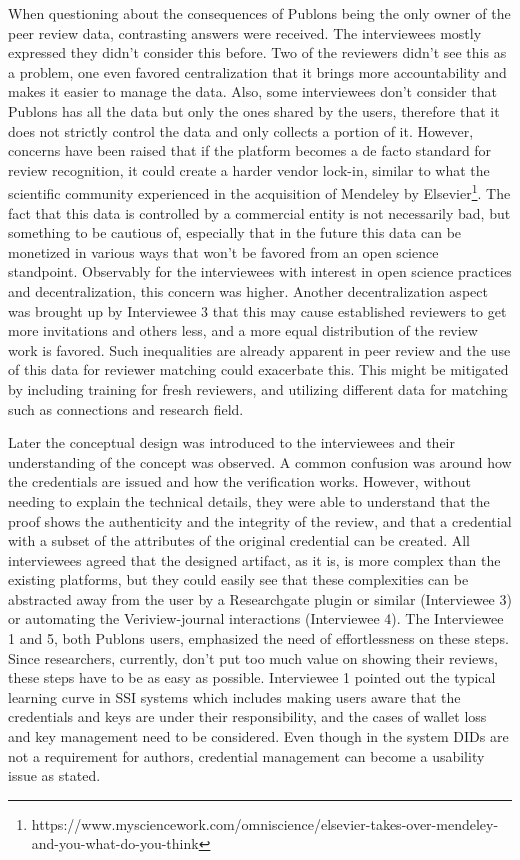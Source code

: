 When questioning about the consequences of Publons being the only owner of the peer review data, contrasting answers were received. The interviewees mostly expressed they didn't consider this before. Two of the reviewers didn't see this as a problem, one even favored centralization that it brings more accountability and makes it easier to manage the data. Also, some interviewees don't consider that Publons has all the data but only the ones shared by the users, therefore that it does not strictly control the data and only collects a portion of it. However, concerns have been raised that if the platform becomes a de facto standard for review recognition, it could create a harder vendor lock-in, similar to what the scientific community experienced in the acquisition of Mendeley by Elsevier\footnote{https://www.mysciencework.com/omniscience/elsevier-takes-over-mendeley-and-you-what-do-you-think}. The fact that this data is controlled by a commercial entity is not necessarily bad, but something to be cautious of, especially that in the future this data can be monetized in various ways that won't be favored from an open science standpoint. Observably for the interviewees with interest in open science practices and decentralization, this concern was higher. Another decentralization aspect was brought up by Interviewee 3 that this may cause established reviewers to get more invitations and others less, and a more equal distribution of the review work is favored. Such inequalities are already apparent in peer review \parencite{Warne.2016, Publons.2018,Ware.2008, Hochberg.2009} and the use of this data for reviewer matching could exacerbate this. This might be mitigated by including training for fresh reviewers, and utilizing different data for matching such as connections and research field. 

Later the conceptual design was introduced to the interviewees and their understanding of the concept was observed. A common confusion was around how the credentials are issued and how the verification works. However, without needing to explain the technical details, they were able to understand that the proof shows the authenticity and the integrity of the review, and that a credential with a subset of the attributes of the original credential can be created. All interviewees agreed that the designed artifact, as it is, is more complex than the existing platforms, but they could easily see that these complexities can be abstracted away from the user by a Researchgate plugin or similar (Interviewee 3) or automating the Veriview-journal interactions (Interviewee 4). The Interviewee 1 and 5, both Publons users, emphasized the need of effortlessness on these steps. Since researchers, currently, don't put too much value on showing their reviews, these steps have to be as easy as possible. Interviewee 1 pointed out the typical learning curve in \acrshort{SSI} systems which includes making users aware that the credentials and keys are under their responsibility, and the cases of wallet loss and key management need to be considered. Even though in the system \acrshort{DID}s are not a requirement for authors, credential management can become a usability issue as stated. 

